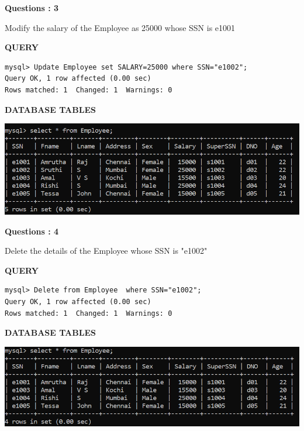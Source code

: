 \documentclass[a4paper,12pt]{report}
\begin{document}
\begin{flushleft}
    \textbf{Questions : 3}
\end{flushleft}
Modify the salary of the Employee as 25000 whose SSN is e1001
\begin{flushleft}
		\textbf{QUERY }
	\end{flushleft}
\begin{verbatim}
mysql> Update Employee set SALARY=25000 where SSN="e1002";
Query OK, 1 row affected (0.00 sec)
Rows matched: 1  Changed: 1  Warnings: 0

\end{verbatim}


\begin{flushleft}
		\textbf{DATABASE TABLES} 
\end{flushleft} 

\includegraphics[scale=0.6]{Screenshot (467).png}

\begin{flushleft}
    \textbf{Questions : 4}
\end{flushleft}
Delete the details of the Employee whose SSN is "e1002"
\begin{flushleft}
		\textbf{QUERY }
	\end{flushleft}
\begin{verbatim}
mysql> Delete from Employee  where SSN="e1002";
Query OK, 1 row affected (0.00 sec)
Rows matched: 1  Changed: 1  Warnings: 0

\end{verbatim}


\begin{flushleft}
		\textbf{DATABASE TABLES} 
\end{flushleft} 

\includegraphics[scale=0.6]{Screenshot (468).png}
\newpage
\end{document}

